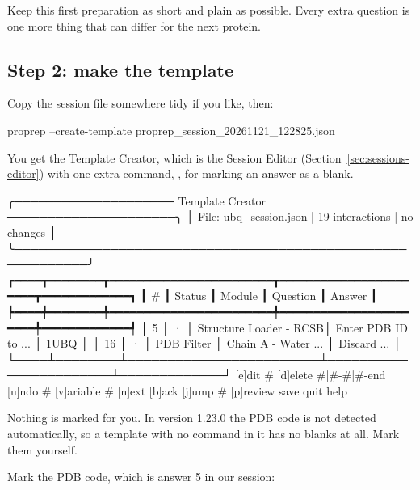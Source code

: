 \begin{tip}
Keep this first preparation as short and plain as possible. Every extra
question is one more thing that can differ for the next protein.
\end{tip}

\subsection{Step 2: make the template}

Copy the session file somewhere tidy if you like, then:

\begin{terminal}
proprep --create-template proprep_session_20261121_122825.json
\end{terminal}

You get the Template Creator, which is the Session Editor
(Section~\ref{sec:sessions-editor}) with one extra command, , for
marking an answer as a blank.

\begin{screen}
╭──────────────────── Template Creator ─────────────────────╮
│ File: ubq_session.json  |  19 interactions  |  no changes │
╰───────────────────────────────────────────────────────────╯
┏━━━━┳━━━━━━━━┳━━━━━━━━━━━━━━━━━━━━━━━━┳━━━━━━━━━━━━━━━━━━━━━━━┳━━━━━━━━━━━━━┓
┃  # ┃ Status ┃ Module                 ┃ Question              ┃ Answer      ┃
┡━━━━╇━━━━━━━━╇━━━━━━━━━━━━━━━━━━━━━━━━╇━━━━━━━━━━━━━━━━━━━━━━━╇━━━━━━━━━━━━━┩
│  5 │   ·    │ Structure Loader - RCSB│ Enter PDB ID to ...   │ 1UBQ        │
│ 16 │   ·    │ PDB Filter             │ Chain A - Water ...   │ Discard ... │
└────┴────────┴────────────────────────┴───────────────────────┴─────────────┘
[e]dit #  [d]elete #|#-#|#-end  [u]ndo #  [v]ariable #  [n]ext  [b]ack
[j]ump #  [p]review  save  quit  help
\end{screen}

\begin{watchout}
Nothing is marked for you. In version 1.23.0 the PDB code is not detected
automatically, so a template with no  command in it has no blanks at
all. Mark them yourself.
\end{watchout}

Mark the PDB code, which is answer 5 in our session:


